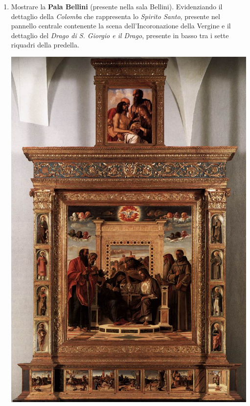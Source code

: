 \documentclass[12pt,a4paper]{article}
\begin{document}
\begin{enumerate}
	\item Mostrare la \textbf{Pala Bellini} (presente nella sala Bellini). Evidenziando il dettaglio della \textit{Colomba} che rappresenta lo \textit{Spirito Santo}, presente nel pannello centrale contenente la scena dell'Incoronazione della Vergine e il dettaglio del \textit{Drago di S. Giorgio e il Drago}, presente in basso tra i sette riquadri della predella.\par
	\begin{minipage}{\linewidth}
		\centering
		\includegraphics[scale=0.8]{Pala_di_pesaro.jpg}
	\end{minipage}
	

\end{enumerate}
\end{document}
